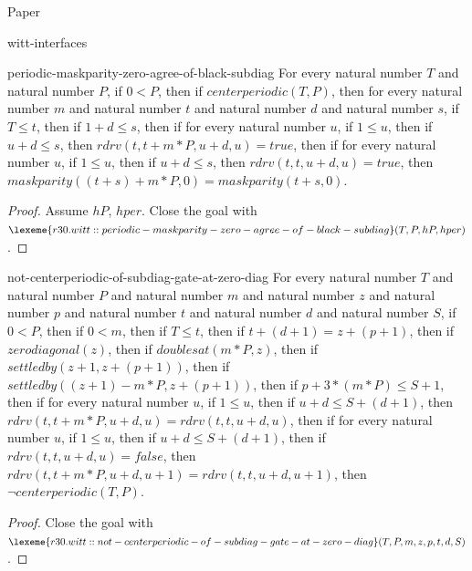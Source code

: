 \begin{lexlean}{Paper}
\begin{section}{witt-interfaces}
  \begin{theorem}{periodic-maskparity-zero-agree-of-black-subdiag}
  For every natural number \(T\) and natural number \(P\), if \(0 < P\), then if \(centerperiodic(T, P)\), then for every natural number \(m\) and natural number \(t\) and natural number \(d\) and natural number \(s\), if \(T ≤ t\), then if \(1 + d ≤ s\), then if for every natural number \(u\), if \(1 ≤ u\), then if \(u + d ≤ s\), then \(rdrv(t, t + m * P, u + d, u) = true\), then if for every natural number \(u\), if \(1 ≤ u\), then if \(u + d ≤ s\), then \(rdrv(t, t, u + d, u) = true\), then \(maskparity((t + s) + m * P, 0) = maskparity(t + s, 0)\).
  \begin{proof}
  Assume \(hP\), \(hper\).
  Close the goal with \(\lexeme{r30.witt::periodic-maskparity-zero-agree-of-black-subdiag}(T, P, hP, hper)\).
  \end{proof}
  \end{theorem}

  \begin{theorem}{not-centerperiodic-of-subdiag-gate-at-zero-diag}
  For every natural number \(T\) and natural number \(P\) and natural number \(m\) and natural number \(z\) and natural number \(p\) and natural number \(t\) and natural number \(d\) and natural number \(S\), if \(0 < P\), then if \(0 < m\), then if \(T ≤ t\), then if \(t + (d + 1) = z + (p + 1)\), then if \(zerodiagonal(z)\), then if \(doublesat(m * P, z)\), then if \(settledby(z + 1, z + (p + 1))\), then if \(settledby((z + 1) - m * P, z + (p + 1))\), then if \(p + 3 * (m * P) ≤ S + 1\), then if for every natural number \(u\), if \(1 ≤ u\), then if \(u + d ≤ S + (d + 1)\), then \(rdrv(t, t + m * P, u + d, u) = rdrv(t, t, u + d, u)\), then if for every natural number \(u\), if \(1 ≤ u\), then if \(u + d ≤ S + (d + 1)\), then if \(rdrv(t, t, u + d, u) = false\), then \(rdrv(t, t + m * P, u + d, u + 1) = rdrv(t, t, u + d, u + 1)\), then \(¬ centerperiodic(T, P)\).
  \begin{proof}
  Close the goal with \(\lexeme{r30.witt::not-centerperiodic-of-subdiag-gate-at-zero-diag}(T, P, m, z, p, t, d, S)\).
  \end{proof}
  \end{theorem}


\end{section}
\end{lexlean}
